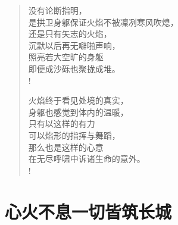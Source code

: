 \documentclass[UTF8, 12pt, a4paper]{ctexrep} %
\begin{document}
\begin{verse}
    没有论断指明，\\
    是拱卫身躯保证火焰不被凜冽寒风吹熄，\\
    还是只有矢志的火焰，\\
    沉默以后再无噼啪声响，\\
    照亮若大空旷的身躯\\
    即便成沙砾也聚拢成堆。\\!

    火焰终于看见处境的真实，\\
    身躯也感觉到体内的温暖，\\
    只有以这样的有力\\
    可以焰形的指挥与舞蹈，\\
    那么也是这样的心意\\
    在无尽呼啸中诉诸生命的意外。\\!

\end{verse}
\newpage

\section*{心火不息一切皆筑长城}
\newpage
\end{document}
